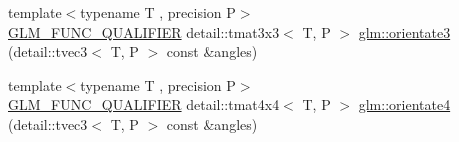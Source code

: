 \begin{DoxyCompactItemize}
\item 
{\footnotesize template$<$typename T , precision P$>$ }\\\hyperlink{setup_8hpp_a33fdea6f91c5f834105f7415e2a64407}{G\+L\+M\+\_\+\+F\+U\+N\+C\+\_\+\+Q\+U\+A\+L\+I\+F\+I\+ER} detail\+::tmat3x3$<$ T, P $>$ \hyperlink{group__gtx__euler__angles_gab6a2a986916647ddedc94bbd2516f20c}{glm\+::orientate3} (detail\+::tvec3$<$ T, P $>$ const \&angles)
\item 
{\footnotesize template$<$typename T , precision P$>$ }\\\hyperlink{setup_8hpp_a33fdea6f91c5f834105f7415e2a64407}{G\+L\+M\+\_\+\+F\+U\+N\+C\+\_\+\+Q\+U\+A\+L\+I\+F\+I\+ER} detail\+::tmat4x4$<$ T, P $>$ \hyperlink{group__gtx__euler__angles_ga3b9f62da9726cdad708df41712792082}{glm\+::orientate4} (detail\+::tvec3$<$ T, P $>$ const \&angles)
\end{DoxyCompactItemize}
